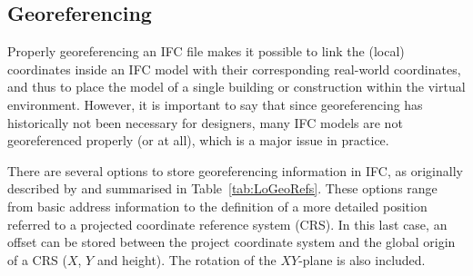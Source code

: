 %

\subsection{Georeferencing}

Properly georeferencing an IFC file makes it possible to link the (local) coordinates inside an IFC model with their corresponding real-world coordinates, and thus to place the model of a single building or construction within the virtual environment.
However, it is important to say that since georeferencing has historically not been necessary for designers, many IFC models are not georeferenced properly (or at all), which is a major issue in practice.

There are several options to store georeferencing information in IFC, as originally described by \citet{clemen2019level} and summarised in Table~\ref{tab:LoGeoRefs}.
These options range from basic address information to the definition of a more detailed position referred to a projected coordinate reference system (CRS).
In this last case, an offset can be stored between the project coordinate system and the global origin of a CRS (\(X\), \(Y\) and height).
The rotation of the \(XY\)-plane is also included.

